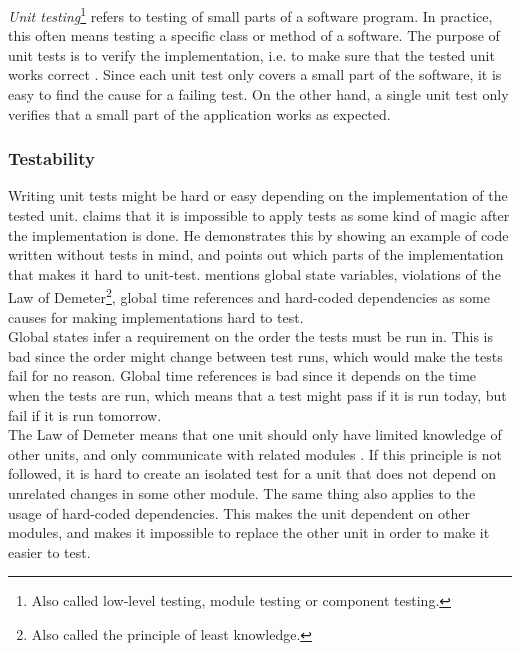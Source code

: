 \MakeShortVerb{\|}


\emph{Unit testing}\footnote{Also called low-level testing, module
testing or component testing.} refers to testing of small parts of a
software program. In practice, this often means testing a specific class
or method of a software. The purpose of unit tests is to verify the
implementation, i.e. to make sure that the tested unit works correct
\cite{book:pfleeger}. Since each unit test only covers a small part of
the software, it is easy to find the cause for a failing test. On the
other hand, a single unit test only verifies that a small part of the
application works as expected.\\

\subsubsection{Testability}

Writing unit tests might be hard or easy depending on the implementation
of the tested unit. \citet{video:misko_psychology} claims that it is
impossible to apply tests as some kind of magic after the implementation
is done. He demonstrates this by showing an example of code written
without tests in mind, and points out which parts of the implementation
that makes it hard to unit-test. \citeauthor{video:misko_psychology}
mentions global state variables, violations of the Law of
Demeter\footnote{Also called the principle of least knowledge.}, global
time references and hard-coded dependencies as some causes for making
implementations hard to test.\\

Global states infer a requirement on the order the tests must be run in.
This is bad since the order might change between test runs, which would
make the tests fail for no reason. Global time references is bad since
it depends on the time when the tests are run, which means that a test
might pass if it is run today, but fail if it is run tomorrow.\\

The Law of Demeter means that one unit should only have limited
knowledge of other units, and only communicate with related modules
\cite{wiki:demeter}. If this principle is not followed, it is hard to
create an isolated test for a unit that does not depend on unrelated
changes in some other module. The same thing also applies to the usage
of hard-coded dependencies. This makes the unit dependent on other
modules, and makes it impossible to replace the other unit in order to
make it easier to test.\\

